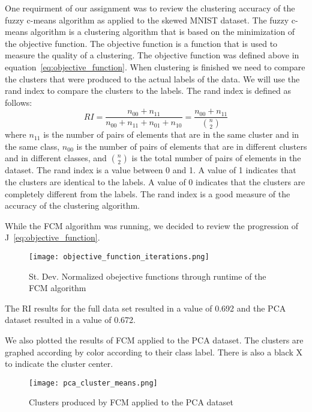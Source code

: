 One requirment of our assignment was to review the clustering accuracy of the fuzzy c-means algorithm as applied to the skewed MNIST dataset.
The fuzzy c-means algorithm is a clustering algorithm that is based on the minimization of the objective function. 
The objective function is a function that is used to measure the quality of a clustering. The objective function was defined above in equation~\ref{eq:objective_function}.
When clustering is finished we need to compare the clusters that were produced to the actual labels of the data. We will use the rand index to compare the clusters to the labels. The rand index is defined as follows:
\begin{equation}
\label{eq:rand_index}
RI = \frac{n_{00} + n_{11}}{n_{00} + n_{11} +n_{01} + n_{10}} = \frac{n_{00} + n_{11}}{{n \choose 2}}
\end{equation}
where $n_{11}$ is the number of pairs of elements that are in the same cluster and in the same class, $n_{00}$ is the number of pairs of elements that are in different clusters and in different classes, and ${n} \choose {2}$ is the total number of pairs of elements in the dataset. 
The rand index is a value between 0 and 1. 
A value of 1 indicates that the clusters are identical to the labels.
A value of 0 indicates that the clusters are completely different from the labels. 
The rand index is a good measure of the accuracy of the clustering algorithm. 

While the FCM algorithm was running, we decided to review the progression of J~\ref{eq:objective_function}.

\begin{figure}[H]
    \centering
    \texttt{[image: objective\_function\_iterations.png]}
    \caption{St. Dev. Normalized obejective functions through runtime of the FCM algorithm}
    \label{fig:objective_function_iterations}    
\end{figure}

The RI results for the full data set resulted in a value of 0.692 and the PCA dataset resulted in a value of 0.672.

We also plotted the results of FCM applied to the PCA dataset. The clusters are graphed according by color according to their class label. 
There is also a black X to indicate the cluster center.

\begin{figure}[H]
    \centering
    \texttt{[image: pca\_cluster\_means.png]}
    \caption{Clusters produced by FCM applied to the PCA dataset}
    \label{fig:pca_clusters}
\end{figure}






